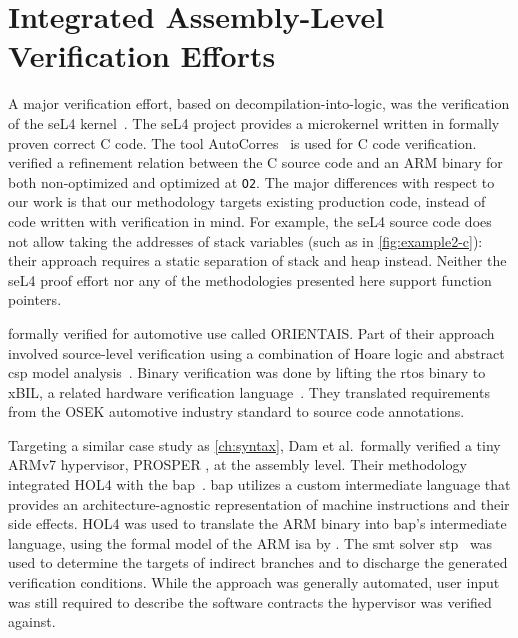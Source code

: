 \section{Integrated Assembly-Level Verification Efforts}\label{se:integrated_assembly}
A major verification effort, based on decompilation-into-logic,
was the verification of the seL4 kernel~\citep{klein2009sel4,Klein_AEMSKH_14}.
The seL4 project provides a microkernel written in formally proven correct C code.
The tool AutoCorres~\citep{greenaway2012bridging} is used for C code verification.
\citet{sewell2013tvv} verified a refinement relation between the C source code
and an ARM binary for both non-optimized and optimized at \lstinline{O2}.
The major differences with respect to our work
is that our methodology targets existing production code,
instead of code written with verification in mind.
For example, the seL4 source code does not allow taking the addresses of stack variables
(such as in \cref{fig:example2-c}):
their approach requires a static separation of stack and heap instead.
Neither the seL4 proof effort nor any of the methodologies presented here
support function pointers.

\citet{shi2012orientais} formally verified  for automotive use
called ORIENTAIS.
Part of their approach involved source-level verification
using a combination of Hoare logic
and abstract \ac{csp} model analysis~\citep{hoare1978csp}.
Binary verification was done by lifting the \ac{rtos} binary to xBIL,
a related hardware verification language~\citep{shi2012xbil}.
They translated requirements from the OSEK automotive industry standard
to source code annotations.

Targeting a similar case study as \cref{ch:syntax},
Dam et al.\ formally verified a tiny ARMv7 hypervisor,
PROSPER \citep{dam2013hypervisor,baumann2016high},
at the assembly level.
Their methodology integrated HOL4 with the \ac{bap}~\citep{brumley2011bap}.
\Ac{bap} utilizes a custom intermediate language
that provides an architecture-agnostic representation of machine instructions
and their side effects.
HOL4 was used to translate the ARM binary into \ac{bap}'s intermediate language,
using the formal model of the ARM \ac{isa} by \citet{fox2010arm}.
The \ac{smt} solver \ac{stp}~\citep{ganesh2007stp}
was used to determine the targets of indirect branches
and to discharge the generated verification conditions.
While the approach was generally automated,
user input was still required to describe the software contracts
the hypervisor was verified against.

